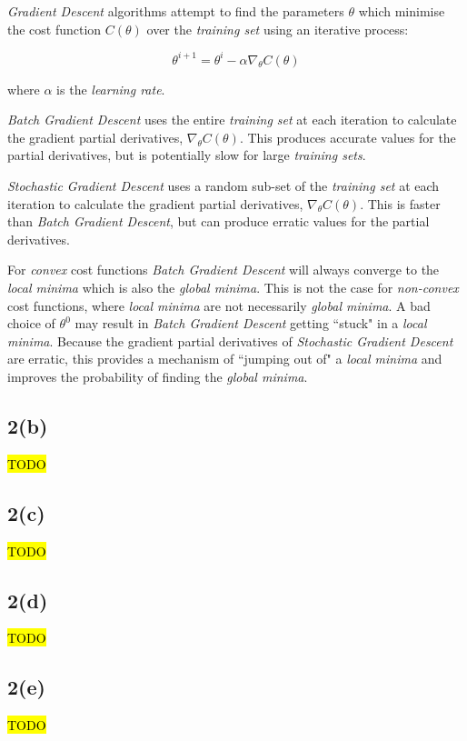 \documentclass[12pt, a4paper,reqno]{article}
\begin{document}
\emph{Gradient Descent} algorithms attempt to find the parameters $\theta$ which minimise the cost function $C(\theta)$ over the \emph{training set} using an iterative process:

\begin{equation}
\theta^{i+1} = \theta^i - \alpha\nabla_\theta C(\theta)
\end{equation}

where $\alpha$ is the \emph{learning rate}.

\emph{Batch Gradient Descent} uses the entire \emph{training set} at each iteration to calculate the gradient partial derivatives, $\nabla_\theta C(\theta)$. This produces accurate values for the partial derivatives, but is potentially slow for large \emph{training sets}.

\emph{Stochastic Gradient Descent} uses a random sub-set of the \emph{training set} at each iteration to calculate the gradient partial derivatives, $\nabla_\theta C(\theta)$. This is faster than \emph{Batch Gradient Descent}, but can produce erratic values for the partial derivatives. 

For \emph{convex} cost functions \emph{Batch Gradient Descent} will always converge to the \emph{local minima} which is also the \emph{global minima}. This is not the case for \emph{non-convex} cost functions, where \emph{local minima} are not necessarily \emph{global minima}. A bad choice of $\theta^0$ may result in \emph{Batch Gradient Descent} getting ``stuck" in a \emph{local minima}. Because the gradient partial derivatives of \emph{Stochastic Gradient Descent} are erratic, this provides a mechanism of ``jumping out of" a \emph{local minima} and improves the probability of finding the \emph{global minima}.

\subsection*{2(b)}
\hl{TODO}

\subsection*{2(c)}
\hl{TODO}

\subsection*{2(d)}
\hl{TODO}

\subsection*{2(e)}
\hl{TODO}
\end{document}
